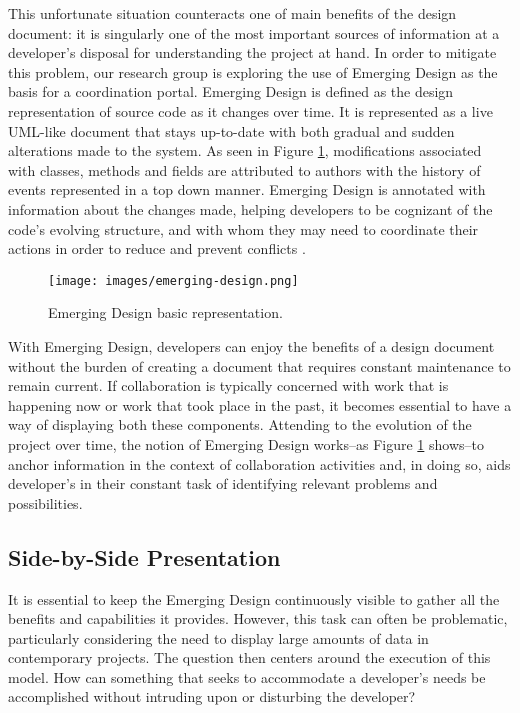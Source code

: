 \documentclass[10pt, conference, compsocconf]{IEEEtran}
\begin{document}
This unfortunate situation counteracts one of main benefits of the design document: it is singularly one of the most important sources of information at a developer's disposal for understanding the project at hand.  In order to mitigate this problem, our research group is exploring the use of Emerging Design \cite{Chen:2006} as the basis for a coordination portal. Emerging Design is defined as the design representation of source code as it changes over time.  It is represented as a live UML-like document that stays up-to-date with both gradual and sudden alterations made to the system. As seen in Figure \ref{fig:emerging-design}, modifications associated with classes, methods and fields are attributed to authors with the history of events represented in a top down manner.  Emerging Design is annotated with information about the changes made, helping developers to be cognizant of the code's evolving structure, and with whom they may need to coordinate their actions in order to reduce and prevent conflicts \cite{Proenca:2009:UED}. 

\begin{figure}[!t]
	\centering
		\texttt{[image: images/emerging-design.png]}
	\caption{Emerging Design basic representation.}
	\label{fig:emerging-design}
\end{figure} 

With Emerging Design, developers can enjoy the benefits of a design document without the burden of creating a document that requires constant maintenance to remain current.  If collaboration is typically concerned with work that is happening now or work that took place in the past, it becomes essential to have a way of displaying both these components.  Attending to the evolution of the project over time, the notion of Emerging Design works--as Figure \ref{fig:emerging-design} shows--to anchor information in the context of collaboration activities and, in doing so, aids developer's in their constant task of identifying relevant problems and possibilities.

\subsection{Side-by-Side Presentation}

It is essential to keep the Emerging Design continuously visible to gather all the benefits and capabilities it provides. However, this task can often be problematic, particularly considering the need to display large amounts of data in contemporary projects. The question then centers around the execution of this model. How can something that seeks to accommodate a developer's needs be accomplished without intruding upon or disturbing the developer?
\end{document}
